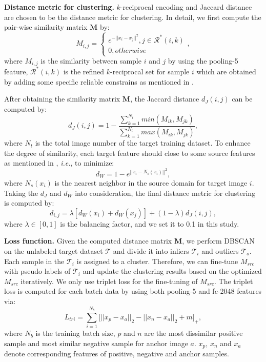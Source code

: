 \documentclass[letterpaper]{article} \usepackage{aaai20}  \usepackage{times}  \usepackage{helvet} \usepackage{courier}  \usepackage[hyphens]{url}  \usepackage{graphicx} \urlstyle{rm} \def\UrlFont{\rm}  \usepackage{graphicx}  \frenchspacing  \setlength{\pdfpagewidth}{8.5in}  \setlength{\pdfpageheight}{11in}  \usepackage{color}
\begin{document}
\textbf{Distance metric for clustering.}
   $k$-reciprocal encoding and Jaccard distance are chosen to be the distance metric for clustering. In detail, we first compute the pair-wise similarity matrix $\mathbf{M}$ by:
    \begin{equation}
    \label{eq:dis}
         M_{i,j}=\left\{
           \begin{array}{ll}
             e^{-||x_i-x_j||^2}, j \in \mathcal{R^*}(i,k) \\
             0,  otherwise 
           \end{array}
         \right.,
    \end{equation} 
    where $M_{i,j}$ is the similarity between sample $i$ and $j$ by using the pooling-5 feature,  $\mathcal{R^*}(i,k)$ is the refined $k$-reciprocal set for sample $i$ which are obtained by adding some specific reliable constrains as mentioned in \cite{zhong2017re}. 

    After obtaining the similarity matrix $\mathbf{M}$, the Jaccard distance $d_{J}(i,j)$ can be computed by: 
    \begin{equation}
        d_{J}(i,j) = 1-\frac{\sum_{k=1}^{N_t}{min(M_{ik},M_{jk})}}{\sum_{k=1}^{N_t}{max(M_{ik},M_{jk})}},
    \end{equation}
    where $N_t$ is the total image number of the target training dataset. To enhance the degree of similarity, each target feature should close to some source features as mentioned in \cite{panareda2017open}, \textit{i.e.}, to minimize:
    \begin{equation}
        d_{W} = 1-e^{||x_i-N_{s}(x_i)||^2},
    \end{equation}
    where $N_{s}(x_i)$ is the nearest neighbor in the source domain for target image $i$. Taking the $d_{J}$ and $d_{W}$ into consideration, the final distance metric for clustering is computed by:
    \begin{equation}
    \label{eq:src}
        d_{i,j} = \lambda [d_{W}(x_i)+d_{W}(x_j)] + (1-\lambda) d_{J}(i,j),
    \end{equation}
    where $\lambda \in [0,1]$ is the balancing factor, and we set it to 0.1 in this study. 
    
    
    \textbf{Loss function.}	
    Given the computed distance matrix $\mathbf{M}$, we perform DBSCAN on the unlabeled target dataset $\mathcal{T}$ and divide it into inliers $\mathcal{T}_{i}$ and outliers $\mathcal{T}_o$. Each sample in the $\mathcal{T}_{i}$ is assigned to a cluster. Therefore, we can fine-tune $M_{src}$ with pseudo labels of $\mathcal{T}_{i}$ and update the clustering results based on the optimized $M_{src}$ iteratively. We only use triplet loss for the fine-tuning of $M_{src}$. The triplet loss is computed for each batch data by using both pooling-5 and fc-2048 features via:
	\begin{equation}
        \label{eq:triplet}
        L_{tri}=\sum_{i=1}^{N_b}\Big[||x_p-x_a||_2- ||x_n-x_a||_2+m\Big]_{+},
    \end{equation}
	where $N_b$ is the training batch size, $p$ and $n$ are the most dissimilar positive sample and most similar negative sample for anchor image $a$. $x_p$, $x_n$ and $x_a$ denote corresponding features of positive, negative and anchor samples.
\end{document}
